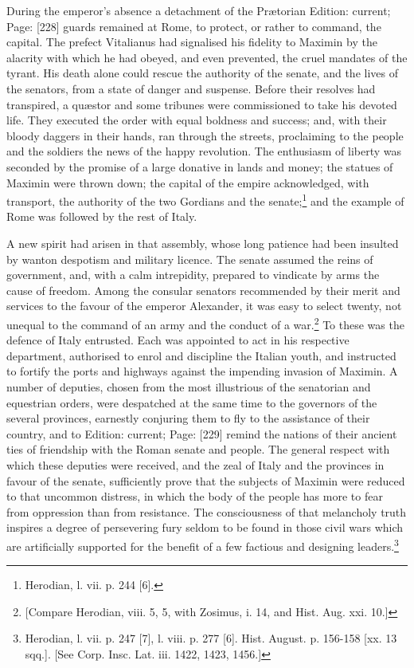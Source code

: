 During the emperor\texthebrew{}’s absence a detachment of the Prætorian Edition: current; Page: [228] guards remained at Rome, to protect, or rather to command, the capital. The prefect Vitalianus had signalised his fidelity to Maximin by the alacrity with which he had obeyed, and even prevented, the cruel mandates of the tyrant. His death alone could rescue the authority of the senate, and the lives of the senators, from a state of danger and suspense. Before their resolves had transpired, a quæstor and some tribunes were commissioned to take his devoted life. They executed the order with equal boldness and success; and, with their bloody daggers in their hands, ran through the streets, proclaiming to the people and the soldiers the news of the happy revolution. The enthusiasm of liberty was seconded by the promise of a large donative in lands and money; the statues of Maximin were thrown down; the capital of the empire acknowledged, with transport, the authority of the two Gordians and the senate;\footnote{Herodian, l. vii. p. 244 [6].} and the example of Rome was followed by the rest of Italy.

A new spirit had arisen in that assembly, whose long patience had been insulted by wanton despotism and military licence. The senate assumed the reins of government, and, with a calm intrepidity, prepared to vindicate by arms the cause of freedom. Among the consular senators recommended by their merit and services to the favour of the emperor Alexander, it was easy to select twenty, not unequal to the command of an army and the conduct of a war.\footnote{[Compare Herodian, viii. 5, 5, with Zosimus, i. 14, and Hist. Aug. xxi. 10.]} To these was the defence of Italy entrusted. Each was appointed to act in his respective department, authorised to enrol and discipline the Italian youth, and instructed to fortify the ports and highways against the impending invasion of Maximin. A number of deputies, chosen from the most illustrious of the senatorian and equestrian orders, were despatched at the same time to the governors of the several provinces, earnestly conjuring them to fly to the assistance of their country, and to Edition: current; Page: [229] remind the nations of their ancient ties of friendship with the Roman senate and people. The general respect with which these deputies were received, and the zeal of Italy and the provinces in favour of the senate, sufficiently prove that the subjects of Maximin were reduced to that uncommon distress, in which the body of the people has more to fear from oppression than from resistance. The consciousness of that melancholy truth inspires a degree of persevering fury seldom to be found in those civil wars which are artificially supported for the benefit of a few factious and designing leaders.\footnote{Herodian, l. vii. p. 247 [7], l. viii. p. 277 [6]. Hist. August. p. 156-158 [xx. 13 sqq.]. [See Corp. Insc. Lat. iii. 1422, 1423, 1456.]}


